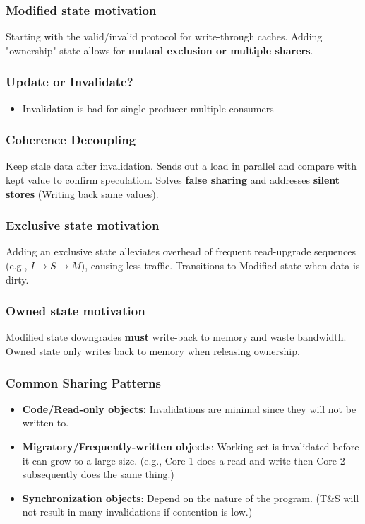 \documentclass{article}
\begin{document}
\begin{multicols*}{2}
\subsubsection{Modified state motivation}
Starting with the valid/invalid protocol for write-through caches. Adding "ownership" state allows for \textbf{mutual exclusion or multiple sharers}.

\subsubsection*{Update or Invalidate?}
\begin{itemize}
    \item Invalidation is bad for single producer multiple consumers
\end{itemize}

\subsubsection*{Coherence Decoupling}
Keep stale data after invalidation. Sends out a load in parallel and compare with kept value to confirm speculation. Solves \textbf{false sharing} and addresses \textbf{silent stores} (Writing back same values).

\subsubsection{Exclusive state motivation}
Adding an exclusive state alleviates overhead of frequent read-upgrade sequences (e.g., $I \rightarrow S \rightarrow M$), causing less traffic. Transitions to Modified state when data is dirty.

\subsubsection{Owned state motivation}
Modified state downgrades \textbf{must} write-back to memory and waste bandwidth. Owned state only writes back to memory when releasing ownership.

\subsubsection{Common Sharing Patterns}
\begin{itemize}
    \item \textbf{Code/Read-only objects:} Invalidations are minimal since they will not be written to.
    \item \textbf{Migratory/Frequently-written objects}: Working set is invalidated before it can grow to a large size. (e.g., Core 1 does a read and write then Core 2 subsequently does the same thing.)
    \item \textbf{Synchronization objects}: Depend on the nature of the program. (T\&S will not result in many invalidations if contention is low.)
\end{itemize}



\end{multicols*}
\end{document}
